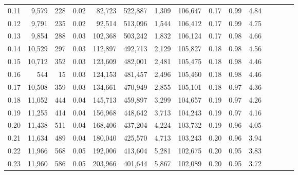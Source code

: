 \begin{tabular}{rrrcrrrrrrrrrrr}
0.11 &   9,579 &    228 &                                       0.02 &   82,723 &  522,887 &    1,309 &  106,647 &  0.17 &  0.99 &                         4.84 \\
0.12 &   9,791 &    235 &                                       0.02 &   92,514 &  513,096 &    1,544 &  106,412 &  0.17 &  0.99 &                         4.75 \\
0.13 &   9,854 &    288 &                                       0.03 &  102,368 &  503,242 &    1,832 &  106,124 &  0.17 &  0.98 &                         4.66 \\
0.14 &  10,529 &    297 &                                       0.03 &  112,897 &  492,713 &    2,129 &  105,827 &  0.18 &  0.98 &                         4.56 \\
0.15 &  10,712 &    352 &                                       0.03 &  123,609 &  482,001 &    2,481 &  105,475 &  0.18 &  0.98 &                         4.46 \\
0.16 &     544 &     15 &                                       0.03 &  124,153 &  481,457 &    2,496 &  105,460 &  0.18 &  0.98 &                         4.46 \\
0.17 &  10,508 &    359 &                                       0.03 &  134,661 &  470,949 &    2,855 &  105,101 &  0.18 &  0.97 &                         4.36 \\
0.18 &  11,052 &    444 &                                       0.04 &  145,713 &  459,897 &    3,299 &  104,657 &  0.19 &  0.97 &                         4.26 \\
0.19 &  11,255 &    414 &                                       0.04 &  156,968 &  448,642 &    3,713 &  104,243 &  0.19 &  0.97 &                         4.16 \\
0.20 &  11,438 &    511 &                                       0.04 &  168,406 &  437,204 &    4,224 &  103,732 &  0.19 &  0.96 &                         4.05 \\
0.21 &  11,634 &    489 &                                       0.04 &  180,040 &  425,570 &    4,713 &  103,243 &  0.20 &  0.96 &                         3.94 \\
0.22 &  11,966 &    568 &                                       0.05 &  192,006 &  413,604 &    5,281 &  102,675 &  0.20 &  0.95 &                         3.83 \\
0.23 &  11,960 &    586 &                                       0.05 &  203,966 &  401,644 &    5,867 &  102,089 &  0.20 &  0.95 &                         3.72 \\

\end{tabular}
